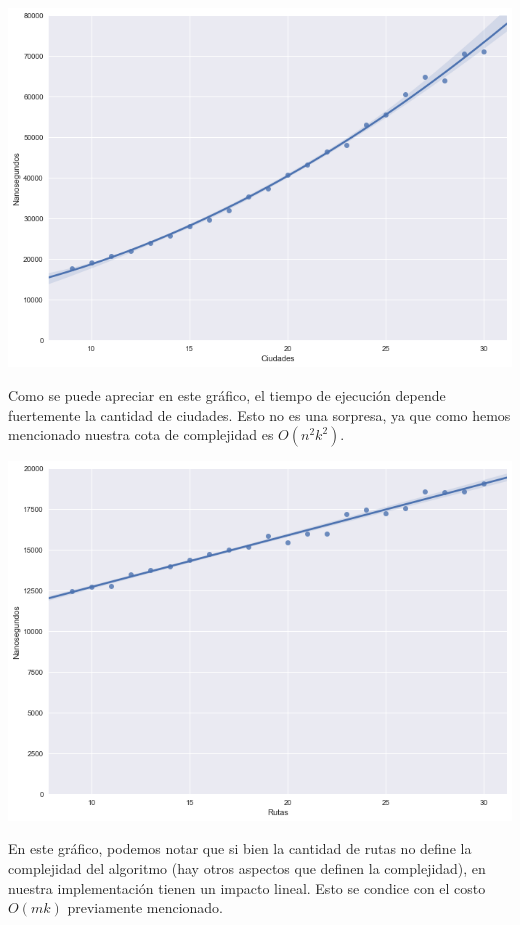 \begin{center}
	\includegraphics[scale=0.5]{imagenes/ej1-1.png}
\end{center}

Como se puede apreciar en este gráfico, el tiempo de ejecución depende fuertemente la cantidad de ciudades. Esto no es una sorpresa, ya que como hemos mencionado nuestra cota de complejidad es $O(n^2k^2)$.

\begin{center}
	\includegraphics[scale=0.5]{imagenes/ej1-2.png}
\end{center}

En este gráfico, podemos notar que si bien la cantidad de rutas no define la complejidad del algoritmo (hay otros aspectos que definen la complejidad), en nuestra implementación tienen un impacto lineal. Esto se condice con el costo $O(mk)$ previamente mencionado.

